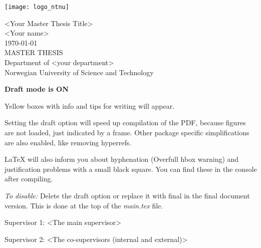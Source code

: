 \thispagestyle{empty}
\texttt{[image: logo\_ntnu]}
\mbox{}\\[6pc]
\begin{center}
\Huge{<Your Master Thesis Title>}\\[2pc]

\Large{<Your name>}\\[1pc]
\large{\monthyeardate\today}\\[2pc]

MASTER THESIS\\
Department of <your department>\\
Norwegian University of Science and Technology
\end{center}

\begin{info}
	\textbf{Draft mode is ON}

	Yellow boxes with info and tips for writing will appear.

	Setting the draft option will speed up compilation of the PDF, because figures are not loaded, just indicated by a frame. Other package specific simplifications are also enabled, like removing hyperrefs. 

	LaTeX will also inform you about hyphenation (Overfull hbox warning) and justification problems with a small black square. You can find these in the console after compiling.

	\emph{To disable:} Delete the draft option or replace it with final in the final document version. This is done at the top of the \emph{main.tex} file.
\end{info}

\vfill

\noindent Supervisor 1: <The main supervisor>

\noindent Supervisor 2: <The co-supervisors (internal and external)> %

